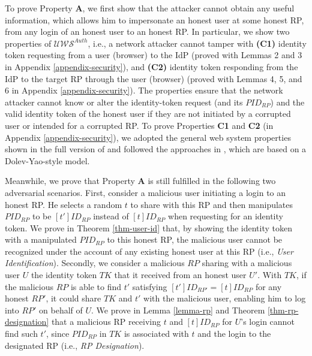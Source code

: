 To prove Property {\bf A}, we first show that the attacker cannot obtain any useful information, which allows him to impersonate an honest user at some honest RP, from any login of an honest user to an honest RP. 
In particular, we show two properties of $\mathcal{UWS}^{Auth}$, i.e., a network attacker cannot tamper with {\bf (C1)} identity token requesting from a user (browser) to the IdP (proved with Lemmas 2 and 3 in Appendix \ref{appendix-security}), and {\bf (C2)} identity token responding from the IdP to the target RP through the user (browser) (proved with Lemmas 4, 5, and 6 in Appendix \ref{appendix-security}).
The properties ensure that the network attacker cannot know or alter the identity-token request (and its $PID_{RP}$) and the valid identity token of the honest user if they are not initiated by a corrupted user or intended for a corrupted RP. To prove Properties {\bf C1} and {\bf C2} (in Appendix \ref{appendix-security}), we adopted the general web system properties shown in the full version of \cite{FettKS14} and followed the approaches in \cite{BrowserID,SPRESSO}, which are based on a Dolev-Yao-style model. %

Meanwhile, we prove that Property {\bf A} is still fulfilled in the following two adversarial scenarios. First, consider a malicious user initiating a login to an honest RP. He selects a random $t$ to share with this RP and then manipulates $PID_{RP}$ to be $[t']ID_{RP}$ instead of $[t]ID_{RP}$ when requesting for an identity token. We prove in Theorem \ref{thm-user-id} that, by showing the identity token with a manipulated $PID_{RP}$ to this honest RP, the malicious user cannot be recognized under the account of any existing honest user at this RP (i.e., {\em User Identification}). Secondly, we consider a malicious $RP$ sharing with a malicious user $U$ the identity token $TK$ that it received from an honest user $U'$. With $TK$, if the malicious $RP$ is able to find $t'$ satisfying $[t']ID_{RP'}=[t]ID_{RP}$ for any honest $RP'$, it could share $TK$ and $t'$ with the malicious user, enabling him to log into $RP'$ on behalf of $U$. We prove in Lemma \ref{lemma-rp} and Theorem \ref{thm-rp-designation} that a malicious RP receiving $t$ and $[t]ID_{RP}$ for $U$'s login cannot find such $t'$, since $PID_{RP}$ in $TK$ is associated with $t$ and the login to the designated RP (i.e., {\em RP Designation}).

